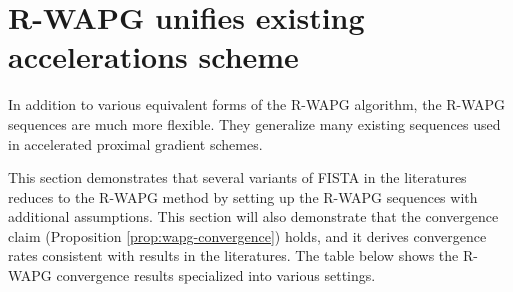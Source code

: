 \documentclass[12pt]{article}
\begin{document}
\section{R-WAPG unifies existing accelerations scheme}\label{sec:rwapg-literatures}
    In addition to various equivalent forms of the R-WAPG algorithm, the R-WAPG sequences are much more flexible. 
    They generalize many existing sequences used in accelerated proximal gradient schemes. 
    \par
    This section demonstrates that several variants of FISTA in the literatures reduces to the R-WAPG method by setting up the R-WAPG sequences with additional assumptions. 
    This section will also demonstrate that the convergence claim (Proposition \ref{prop:wapg-convergence}) holds, and it derives convergence rates consistent with results in the literatures.  
    The table below shows the R-WAPG convergence results specialized into various settings. 
\end{document}

